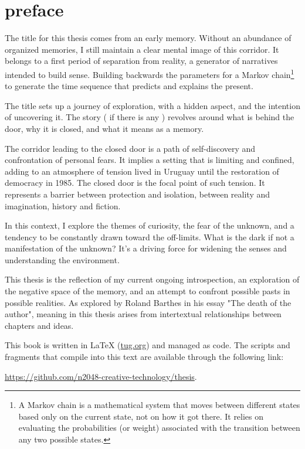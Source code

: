 \chapter*{preface}
\normalsize

\newpage  %
The title for this thesis comes from an early memory. Without an abundance of organized memories, I still maintain a clear mental image of this corridor. It belongs to a first period of separation from reality, a generator of narratives intended to build sense. Building backwards the parameters for a Markov chain\footnote{A Markov chain is a mathematical system that moves between different states based only on the current state, not on how it got there. It relies on evaluating the probabilities (or weight) associated with the transition between any two possible states.} to generate the time sequence that predicts and explains the present.    

The title sets up a journey of exploration, with a hidden aspect, and the intention of uncovering it. The story ( if there is any ) {r}evolves around what is behind the door, why it is closed, and what it means as a memory.

The corridor leading to the closed door is a path of self-discovery and confrontation of personal fears. It implies a setting that is limiting and confined, adding to an atmosphere of tension lived in Uruguay until the restoration of democracy in 1985. The closed door is the focal point of such tension. It represents a barrier between protection and isolation, between reality and imagination, history and fiction.

In this context, I explore the themes of curiosity, the fear of the unknown, and a tendency to be constantly drawn toward the off-limits. What is the dark if not a manifestation of the unknown? It's a driving force for widening the senses and understanding the environment.

This thesis is the reflection of my current ongoing introspection, an exploration of the negative space of the memory, and an attempt to confront possible pasts in possible realities. As explored by Roland Barthes in his essay "The death of the author"\citep{barthes1967}, meaning in this thesis arises from intertextual relationships between chapters and ideas. 



This book is written in \LaTeX{} (\href{https://www.tug.org/texlive/quickinstall.html}{tug.org}) and managed as code. The scripts and fragments that compile into this text are available through the following link: 

\href{https://github.com/n2048-creative-technology/thesis}{https://github.com/n2048-creative-technology/thesis}.